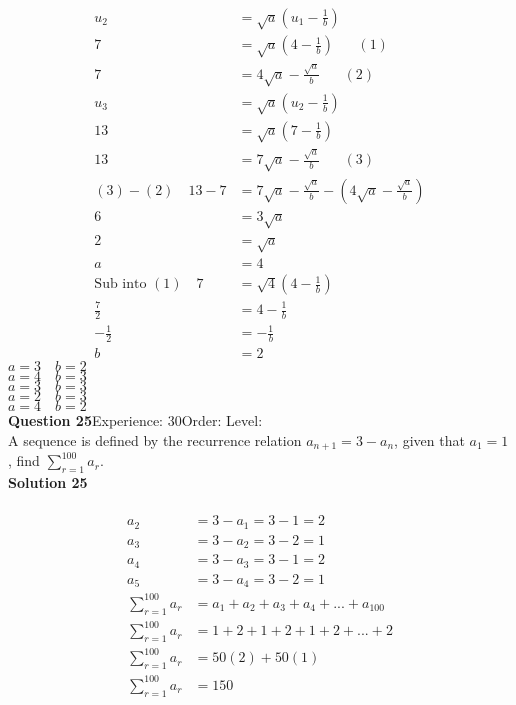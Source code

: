 \documentclass{article}
\begin{document}
\\[-10pt]\begin{align*}
u_2&=\sqrt{a}\left(u_1-\displaystyle\frac{1}{b}\right)\\[2pt]
7&=\sqrt{a}\left(4-\displaystyle\frac{1}{b}\right)\hspace{20pt}(1)\\[2pt]
7&=4\sqrt{a}-\displaystyle\frac{\sqrt{a}}{b}\hspace{20pt}(2)\\[12pt]
u_3&=\sqrt{a}\left(u_2-\displaystyle\frac{1}{b}\right)\\[2pt]
13&=\sqrt{a}\left(7-\displaystyle\frac{1}{b}\right)\\[2pt]
13&=7\sqrt{a}-\displaystyle\frac{\sqrt{a}}{b}\hspace{20pt}(3)\\[12pt]
(3)-(2)\quad13-7&=7\sqrt{a}-\displaystyle\frac{\sqrt{a}}{b}-\left(4\sqrt{a}-\displaystyle\frac{\sqrt{a}}{b}\right)\\[2pt]
6&=3\sqrt{a}\\[2pt]
2&=\sqrt{a}\\[2pt]
a&=4\\[12pt]
\text{Sub into} \,\,(1)\quad 7&=\sqrt{4}\left(4-\displaystyle\frac{1}{b}\right)\\[2pt]
\displaystyle\frac{7}{2}&=4-\displaystyle\frac{1}{b}\\[2pt]
-\displaystyle\frac{1}{2}&=-\displaystyle\frac{1}{b}\\[2pt]
b&=2
\end{align*}
$a=3\quad b=2$\\
$a=4\quad b=3$\\
$a=3\quad b=3$\\
$a=2\quad b=3$\\
$a=4\quad b=2$\\
\noindent\textbf{Question 25}\hspace{20pt}Experience: 30\hspace{20pt}Order: \hspace{20pt}Level: \\[2pt]
A sequence is defined by the recurrence relation $a_{n+1}=3-a_n$, given that  $a_1 =1$, find $\displaystyle\sum_{r=1}^{100} a_r$.\\[4pt]
\noindent\textbf{Solution 25}\\[2pt]
\\[-10pt]\begin{align*}
a_2&=3-a_1=3-1=2\\[7pt]
a_3&=3-a_2=3-2=1\\[7pt]
a_4&=3-a_3=3-1=2\\[7pt]
a_5&=3-a_4=3-2=1\\[7pt]
\displaystyle\sum_{r=1}^{100} a_r &= a_1+a_2+a_3+a_4+...+a_{100}\\[2pt]
\displaystyle\sum_{r=1}^{100} a_r &= 1+2+1+2+1+2+...+2\\[2pt]
\displaystyle\sum_{r=1}^{100} a_r &= 50(2)+50(1)\\[2pt]
\displaystyle\sum_{r=1}^{100} a_r &= 150\\[2pt]
\end{align*}
\end{document}
